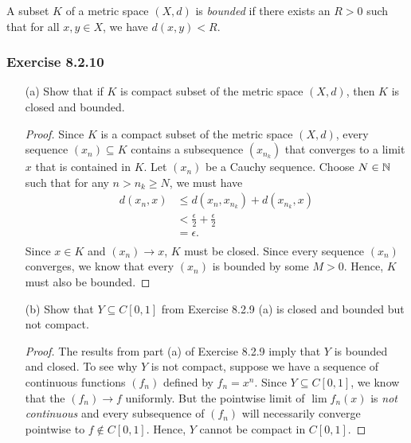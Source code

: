 \begin{definition}[Boundedness]
A subset \( K \) of a metric space \( (X,d)  \) is \textit{bounded} if there exists an \( R > 0  \) such that for all \( x,y \in X  \), we have \( d(x,y) < R  \).
\end{definition}


\subsubsection{Exercise 8.2.10} 
\begin{enumerate}
    \item[(a)] Show that if \( K  \) is compact subset of the metric space \( (X,d)  \), then \( K  \) is closed and bounded.       
        \begin{proof}
        Since \( K  \) is a compact subset of the metric space \( (X,d) \), every sequence \( (x_{n}) \subseteq K  \) contains a subsequence \( (x_{n_{k }})  \) that converges to a limit \( x  \) that is contained in \( K  \). Let \( (x_{n}) \) be a Cauchy sequence. Choose \( N \in \mathbb{N}  \) such that for any \( n > n_{k } \geq N  \), we must have 
        \begin{align*}
            d(x_{n}, x ) &\leq d(x_{n}, x_{n_{k }}) + d(x_{n_{k }}, x)  \\
                         &< \frac{ \epsilon  }{ 2  } + \frac{ \epsilon  }{ 2 } \\ 
                         &= \epsilon.\\
        \end{align*}
        Since \( x \in K  \) and \( (x_{n}) \to x  \), \( K  \) must be closed. Since every sequence \( (x_{n})   \) converges, we know that every \( (x_{n})  \) is bounded by some \( M > 0  \). Hence, \( K  \) must also be bounded.
        \end{proof}
    \item[(b)] Show that \( Y \subseteq C[0,1]  \) from Exercise 8.2.9 (a) is closed and bounded but not compact.
        \begin{proof}
            The results from part (a) of Exercise 8.2.9 imply that \( Y  \) is bounded and closed. To see why \( Y  \) is not compact, suppose we have a sequence of continuous functions \( (f_{n}) \) defined by \( f_{n} = x^{n} \). Since \( Y \subseteq C[0,1] \), we know that the \( (f_{n})  \to f \) uniformly. But the pointwise limit of \( \lim  f_{n}(x) \) is \textit{not continuous} and every subsequence of \( (f_{n}) \) will necessarily converge pointwise to \( f  \notin C[0,1] \). Hence, \( Y  \) cannot be compact in \( C[0,1] \). 
        \end{proof}
\end{enumerate}


